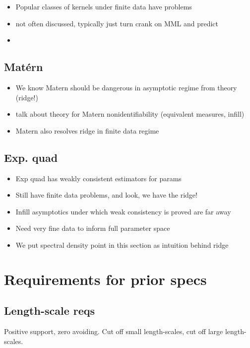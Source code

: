 \documentclass{article}
\begin{document}
\begin{itemize}
  \item Popular classes of kernels under finite data have problems
  \item not often discussed, typically just turn crank on MML and predict
  \item 
\end{itemize}

\subsection{Mat\'{e}rn}

\begin{itemize}
  \item We know Matern should be dangerous in asymptotic regime from theory (ridge!)
  \item talk about theory for Matern nonidentifiability (equivalent measures, infill)
  \item Matern also resolves ridge in finite data regime
\end{itemize}

\subsection{Exp. quad}

\begin{itemize}
  \item Exp quad has weakly consistent estimators for params
  \item Still have finite data problems, and look, we have the ridge!
  \item Infill asymptotics under which weak consistency is proved are far away
  \item Need very fine data to inform full parameter space
  \item We put spectral density point in this section as intuition behind ridge
\end{itemize}

\section{Requirements for prior specs}

\subsection{Length-scale reqs}

Positive support, zero avoiding. Cut off small length-scales, cut off large
length-scales.
\end{document}
